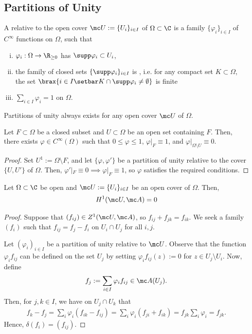 \documentclass[11pt]{report}
\begin{document}
\subsection{Partitions of Unity}

\begin{defn}
    A  relative to the open cover $\mc U:=\{U_i\}_{i \in I}$ of $\Omega \subset \C$ is a family $\{\varphi_i\}_{i \in I}$ of $C^\infty$ functions on $\Omega$, such that
    \begin{enumerate}[(i)]
        \item $\varphi_i:\Omega \to \R_{\geq 0}$ has $\supp \varphi_i \subset U_i$,
        \item the family of closed sets $\{\supp \varphi _i\}_{i \in I}$ is , i.e. for any compact set $K \subset \Omega$, the set $\brax{i \in I \setbar K \cap \supp \varphi_i \neq \emptyset}$ is finite
        \item $\sum_{i \in I}\varphi_i = 1$ on $\Omega$.
    \end{enumerate}
    Partitions of unity always exists for any open cover $\mc U$ of $\Omega$.
\end{defn}

\begin{ex}
    Let $F \subset \Omega$ be a closed subset and $U \subset \Omega$ be an open set containing $F$. Then, there exists $\varphi \in C^\infty (\Omega)$ such that $0 \leq \varphi \leq 1$, $\varphi|_F \equiv 1$, and $\varphi|_{\Omega \setminus U}\equiv 0$.
\end{ex}

\begin{proof}
    Set $U^1 := \Omega \setminus F$, and let $\{\varphi, \varphi'\}$ be a partition of unity relative to the cover $\{U,U'\}$ of $\Omega$. Then, $\varphi'|_F \equiv 0 \implies \varphi|_F \equiv 1$, so $\varphi$ satisfies the required conditions.
\end{proof}

\begin{thm}
    Let $\Omega \subset \C$ be open and $\mc U := \{U_i\}_{i \in I}$ be an open cover of $\Omega$. Then,
    \[
    H^1(\mc U,\mc A)=0
    \]
\end{thm}

\begin{proof}
    Suppose that $(f_{ij})\in Z^1(\mc U, \mc A)$, so $f_{ij}+ f_{jk}=f_{ik}$. We seek a family $(f_i)$ such that $f_{ij}=f_j-f_i$ on $U_i \cap U_j$ for all $i,j$.

    Let $(\varphi _i)_{i \in I}$ be a partition of unity relative to $\mc U$. Observe that the function $\varphi_if_{ij}$ can be defined on the set $U_j$ by setting $\varphi_if_{ij}(z):=0$ for $z \in U_j \setminus U_i$. Now, define
    \[
    f_j := \sum_{i \in I}\varphi_i f_{ij} \in \mc A(U_j).
    \]
    Then, for $j,k \in I$, we have on $U_j \cap U_k$ that
    \begin{align*}
        f_k-f_j = \sum_{i} \varphi_i(f_{ik}-f_{ij}) = \sum_{i}\varphi_i (f_{ji} + f_{ik})=f_{jk}\sum_i \varphi_i = f_{jk}.
    \end{align*}
    Hence, $\delta (f_i) = (f_{ij})$.
\end{proof}
\end{document}
